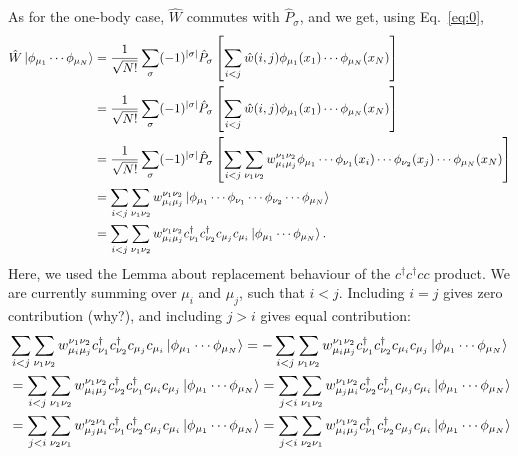 \documentclass{report}
\theoremstyle{plain}
\theoremstyle{definition}
\begin{document}
As for the one-body case, $\hat{W}$ commutes with $\hat{P}_\sigma$,
and we get, using Eq.~\eqref{eq:0},
\begin{equation}
  \begin{split}
    \hat{W}\ket{\phi_{\mu_1}\cdots\phi_{\mu_N}} &= \frac{1}{\sqrt{N!}}
    \sum_\sigma (-1)^{|\sigma|} \hat{P}_\sigma \left[\sum_{i<j}
      \hat{w}(i,j)\phi_{\mu_1}(x_1)\cdots\phi_{\mu_N}(x_N) \right] \\ 
    & = \frac{1}{\sqrt{N!}}
    \sum_\sigma (-1)^{|\sigma|} \hat{P}_\sigma \left[\sum_{i<j}
      \hat{w}(i,j)\phi_{\mu_1}(x_1)\cdots\phi_{\mu_N}(x_N) \right] \\ 
    &=\frac{1}{\sqrt{N!}} \sum_\sigma (-1)^{|\sigma|} \hat{P}_\sigma
    \left[ \sum_{i<j} \sum_{\nu_1\nu_2} w^{\nu_1\nu_2}_{\mu_i\mu_j}
      \phi_{\mu_1} \cdots \phi_{\nu_1}(x_i) \cdots \phi_{\nu_2}(x_j)
      \cdots \phi_{\mu_N}(x_N) \right] \\
    & = \sum_{i<j} \sum_{\nu_1\nu_2}
    w^{\nu_1\nu_2}_{\mu_i\mu_j}
    \ket{\phi_{\mu_1}\cdots\phi_{\nu_1}\cdots\phi_{\nu_2}\cdots
      \phi_{\mu_N}} \\
    & = \sum_{i<j} \sum_{\nu_1\nu_2}
    w^{\nu_1\nu_2}_{\mu_i\mu_j}
    c^\dag_{\nu_1}c^\dag_{\nu_2}
    c_{\mu_j}c_{\mu_i}\ket{\phi_{\mu_1}\cdots\phi_{\mu_N}}.
  \end{split}
\end{equation}
Here, we used the Lemma about replacement behaviour of the $c^\dag
c^\dag c c$ product. We are currently summing over $\mu_i$ and
$\mu_j$, such that $i<j$. Including $i=j$ gives zero contribution
(why?), and including $j>i$ gives equal contribution:
\begin{equation}
  \begin{split}
    &\sum_{i<j} \sum_{\nu_1\nu_2}
    w^{\nu_1\nu_2}_{\mu_i\mu_j}
    c^\dag_{\nu_1}c^\dag_{\nu_2}
    c_{\mu_j}c_{\mu_i}\ket{\phi_{\mu_1}\cdots\phi_{\mu_N}} = 
    -\sum_{i<j} \sum_{\nu_1\nu_2}
    w^{\nu_1\nu_2}_{\mu_i\mu_j}
    c^\dag_{\nu_1}c^\dag_{\nu_2}
    c_{\mu_i}c_{\mu_j}\ket{\phi_{\mu_1}\cdots\phi_{\mu_N}} \\
    &=  \sum_{i<j} \sum_{\nu_1\nu_2}
    w^{\nu_1\nu_2}_{\mu_i\mu_j}
    c^\dag_{\nu_2}c^\dag_{\nu_1}
    c_{\mu_i}c_{\mu_j}\ket{\phi_{\mu_1}\cdots\phi_{\mu_N}} 
    =  \sum_{j<i} \sum_{\nu_1\nu_2}
    w^{\nu_1\nu_2}_{\mu_j\mu_i}
    c^\dag_{\nu_2}c^\dag_{\nu_1}
    c_{\mu_j}c_{\mu_i}\ket{\phi_{\mu_1}\cdots\phi_{\mu_N}} \\
    &=  \sum_{j<i} \sum_{\nu_2\nu_1}
    w^{\nu_2\nu_1}_{\mu_j\mu_i}
    c^\dag_{\nu_1}c^\dag_{\nu_2}
    c_{\mu_j}c_{\mu_i}\ket{\phi_{\mu_1}\cdots\phi_{\mu_N}} 
    =  \sum_{j<i} \sum_{\nu_2\nu_1}
    w^{\nu_1\nu_2}_{\mu_i\mu_j}
    c^\dag_{\nu_1}c^\dag_{\nu_2}
    c_{\mu_j}c_{\mu_i}\ket{\phi_{\mu_1}\cdots\phi_{\mu_N}} 
  \end{split}
\end{equation}
\end{document}
